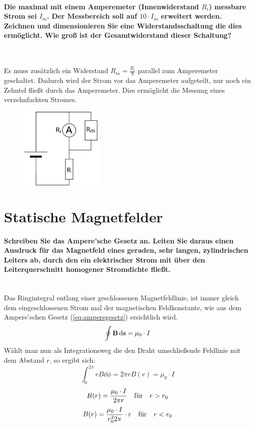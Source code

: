 \documentclass[a4paper, 11pt, ngerman, parskip=half-]{scrartcl}
\begin{document}
\paragraph{Die maximal mit einem Amperemeter (Innenwiderstand $R_i$) messbare Strom sei $I_m$. Der
    Messbereich soll auf $10 \cdot I_m$ erweitert werden. Zeichnen und dimensionieren Sie eine
    Widerstandsschaltung die dies ermöglicht. Wie groß ist der Gesamtwiderstand dieser Schaltung?} ~

Es muss zusätzlich ein Widerstand $R_m = \frac{R_i}{9}$ parallel zum Amperemeter geschaltet. Dadurch
wird der Strom vor das Amperemeter aufgeteilt, nur noch ein Zehntel fließt durch das Amperemeter.
Dies ermöglicht die Messung eines verzehnfachten Stromes.

\begin{figure}[H]
    \centering
    \includegraphics[height=4cm]{image/04/12}
\end{figure}

\newpage

\section{Statische Magnetfelder}

\paragraph{Schreiben Sie das Ampere'sche Gesetz an. Leiten Sie daraus einen Ausdruck für das
    Magnetfeld eines geraden, sehr langen, zylindrischen Leiters ab, durch den ein elektrischer Strom
    mit über den Leiterquerschnitt homogener Stromdichte fließt.}~\\

Das Ringintegral entlang einer geschlossenen Magnetfeldlinie, ist immer gleich dem eingeschlossenen Strom mal der magnetischen Feldkonstante,
wie aus dem Ampere'schen Gesetz (\autoref{eq:amperegesetz}) ersichtlich wird.
%
\begin{equation}
    \label{eq:amperegesetz}
    \oint \vb{B} \dd{\vb{s}} = \mu_0 \cdot I
\end{equation}
Wählt man nun als Integrationsweg die den Draht umschließende Feldlinie mit dem Abstand $r$, so ergibt sich:
\begin{equation}
    \int_{0}^{2\pi} r B \dd{\phi} = 2 \pi r B(r) = \mu_0\cdot I
\end{equation}
\begin{equation}
    B(r) = \frac{\mu_0 \cdot I}{2 \pi r} \qq{für} r > r_0
\end{equation}
\begin{equation}
    B(r) = \frac{\mu_0 \cdot I}{r_0^2 2 \pi} \cdot r \qq{für} r < r_0
\end{equation}
\end{document}
